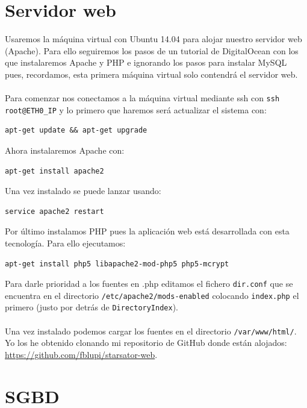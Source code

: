 \section{Servidor web}

Usaremos la máquina virtual con Ubuntu 14.04 para alojar nuestro servidor web (Apache). Para ello seguiremos los pasos de un tutorial de DigitalOcean \cite{InstallLAMPUbuntu14.04} con los que instalaremos Apache y PHP e ignorando los pasos para instalar MySQL pues, recordamos, esta primera máquina virtual solo contendrá el servidor web.
\\ \\
Para comenzar nos conectamos a la máquina virtual mediante ssh con \texttt{ssh root@ETH0\_IP} y lo primero que haremos será actualizar el sistema con:

\begin{lstlisting}
apt-get update && apt-get upgrade
\end{lstlisting}

Ahora instalaremos Apache con:

\begin{lstlisting}
apt-get install apache2
\end{lstlisting}


Una vez instalado se puede lanzar usando:

\begin{lstlisting}
service apache2 restart
\end{lstlisting}

Por último instalamos PHP pues la aplicación web está desarrollada con esta tecnología. Para ello ejecutamos:

\begin{lstlisting}
apt-get install php5 libapache2-mod-php5 php5-mcrypt
\end{lstlisting}

Para darle prioridad a los fuentes en .php editamos el fichero \texttt{dir.conf} que se encuentra en el directorio \texttt{/etc/apache2/mods-enabled} colocando \texttt{index.php} el primero (justo por detrás de \texttt{DirectoryIndex}).
\\ \\
Una vez instalado podemos cargar los fuentes en el directorio \texttt{/var/www/html/}. Yo los he obtenido clonando mi repositorio de GitHub donde están alojados: \url{https://github.com/fblupi/starsator-web}.

\section{SGBD}

